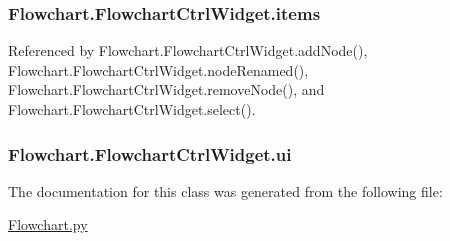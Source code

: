 \subsubsection[{items}]{\setlength{\rightskip}{0pt plus 5cm}Flowchart.\+Flowchart\+Ctrl\+Widget.\+items}\label{classFlowchart_1_1FlowchartCtrlWidget_a2b2cce03df58e42726668ccbea738d16}


Referenced by Flowchart.\+Flowchart\+Ctrl\+Widget.\+add\+Node(), Flowchart.\+Flowchart\+Ctrl\+Widget.\+node\+Renamed(), Flowchart.\+Flowchart\+Ctrl\+Widget.\+remove\+Node(), and Flowchart.\+Flowchart\+Ctrl\+Widget.\+select().

\hypertarget{classFlowchart_1_1FlowchartCtrlWidget_a2f16540e34be423bf6c5633d28cce2b2}{}
\subsubsection[{ui}]{\setlength{\rightskip}{0pt plus 5cm}Flowchart.\+Flowchart\+Ctrl\+Widget.\+ui}\label{classFlowchart_1_1FlowchartCtrlWidget_a2f16540e34be423bf6c5633d28cce2b2}


The documentation for this class was generated from the following file\+:\begin{DoxyCompactItemize}
\item 
\hyperlink{Flowchart_8py}{Flowchart.\+py}\end{DoxyCompactItemize}
